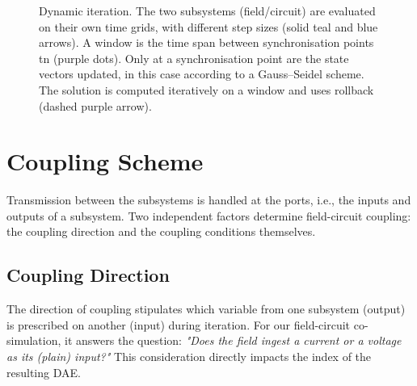 \begin{figure}
    \caption{Dynamic iteration. The two subsystems (field/circuit) are evaluated on their own time grids, with different step sizes (solid teal and blue arrows). A window is the time span between synchronisation points \gls{tn} (purple dots). Only at a synchronisation point are the state vectors updated, in this case according to a Gauss--Seidel scheme. The solution is computed iteratively on a window and uses rollback (dashed purple arrow).}
    \label{fig:dynamic-iteration}
\end{figure}

\section{Coupling Scheme} \label{sec:coupling-scheme}
Transmission between the subsystems is handled at the ports, i.e., the inputs and outputs of a subsystem. Two independent factors determine field-circuit coupling: the coupling direction and the coupling conditions themselves.

\subsection{Coupling Direction} The direction of coupling stipulates which variable from one subsystem (output) is prescribed on another (input) during iteration. For our field-circuit co-simulation, it answers the question: \textit{"Does the field ingest a current or a voltage as its (plain) input?"} This consideration directly impacts the index of the resulting DAE.

